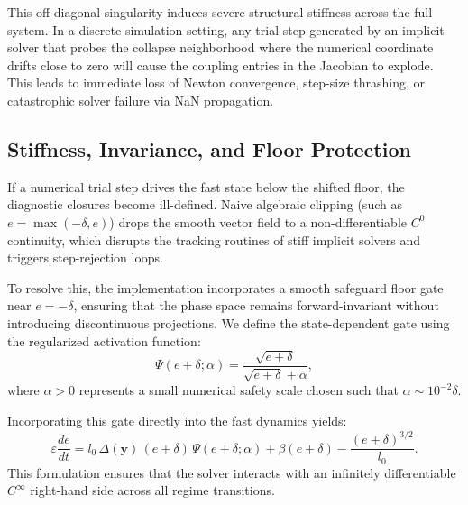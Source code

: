 \documentclass[11pt,letterpaper]{article}
\begin{document}
This off-diagonal singularity induces severe structural stiffness across the full system. In a discrete simulation setting, any trial step generated by an implicit solver that probes the collapse neighborhood where the numerical coordinate drifts close to zero will cause the coupling entries in the Jacobian to explode. This leads to immediate loss of Newton convergence, step-size thrashing, or catastrophic solver failure via NaN propagation.

\subsection{Stiffness, Invariance, and Floor Protection}
\label{subsec:numerical_stiffness}

If a numerical trial step drives the fast state below the shifted floor, the diagnostic closures become ill-defined. Naive algebraic clipping (such as $e = \max(-\delta, e)$) drops the smooth vector field to a non-differentiable $C^0$ continuity, which disrupts the tracking routines of stiff implicit solvers and triggers step-rejection loops.

To resolve this, the implementation incorporates a smooth safeguard floor gate near $e = - \delta$, ensuring that the phase space remains forward-invariant without introducing discontinuous projections. We define the state-dependent gate using the regularized activation function:
\begin{equation}
\Psi(e+\delta; \alpha) = \frac{\sqrt{e+\delta}}{\sqrt{e+\delta}+\alpha},
\label{eq:smooth_gate}
\end{equation}
where $\alpha > 0$ represents a small numerical safety scale chosen such that $\alpha \sim 10^{-2}\delta$.

Incorporating this gate directly into the fast dynamics yields:
\begin{equation}
\varepsilon\frac{de}{dt} = l_0\,\Delta(\mathbf{y})\,(e+\delta)\,\Psi(e+\delta;\alpha) + \beta(e+\delta) - \frac{(e+\delta)^{3/2}}{l_0}.
\label{eq:gated_fast_system}
\end{equation}
This formulation ensures that the solver interacts with an infinitely differentiable $C^\infty$ right-hand side across all regime transitions.
\end{document}
